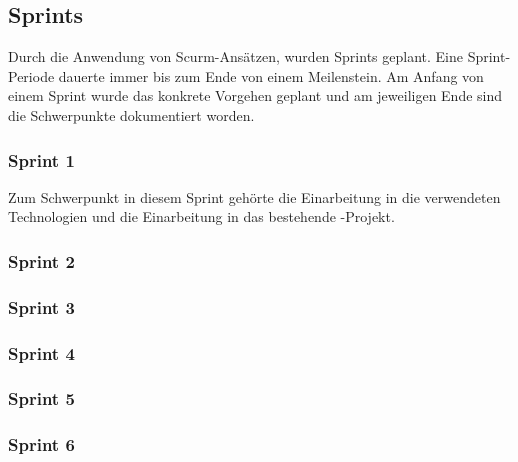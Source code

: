 \subsection{Sprints}
Durch die Anwendung von Scurm-Ansätzen, wurden Sprints geplant. 
Eine Sprint-Periode dauerte immer bis zum Ende von einem Meilenstein. 
Am Anfang von einem Sprint wurde das konkrete Vorgehen geplant und am jeweiligen Ende sind die Schwerpunkte dokumentiert worden.

\subsubsection{Sprint 1}
Zum Schwerpunkt in diesem Sprint gehörte die Einarbeitung in die verwendeten Technologien und die Einarbeitung in das bestehende \kort{}-Projekt.


\subsubsection{Sprint 2}



\subsubsection{Sprint 3}



\subsubsection{Sprint 4}



\subsubsection{Sprint 5}



\subsubsection{Sprint 6}



